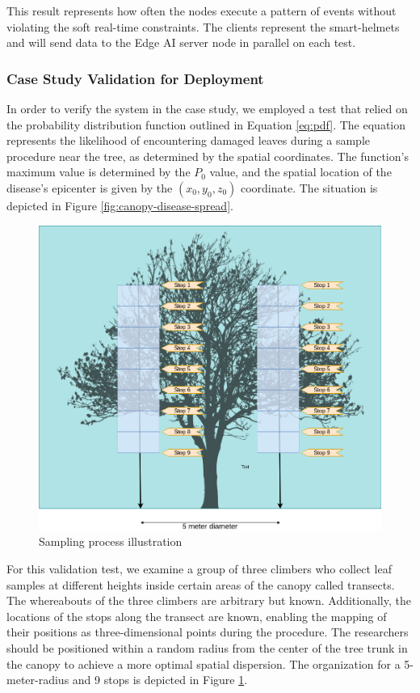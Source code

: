 This result represents how often the nodes execute a pattern of events without violating the soft real-time constraints. The clients represent the smart-helmets and will send data to the Edge AI server node in parallel on each test. 

\subsubsection{Case Study Validation for Deployment}

In order to verify the system in the case study, we employed a test that relied on the probability distribution function outlined in Equation \ref{eq:pdf}. The equation represents the likelihood of encountering damaged leaves during a sample procedure near the tree, as determined by the spatial coordinates. The function's maximum value is determined by the $P_0$ value, and the spatial location of the disease's epicenter is given by the $(x_0, y_0, z_0)$ coordinate. The situation is depicted in Figure \ref{fig:canopy-disease-spread}.

\begin{figure}[h!]
    \centering
    \includegraphics[width = .8\linewidth]{Figures/pin-cylinder-test.png}
    \caption{Sampling process illustration}
    \label{fig:pin-cylinder-test}
\end{figure}

For this validation test, we examine a group of three climbers who collect leaf samples at different heights inside certain areas of the canopy called transects. The whereabouts of the three climbers are arbitrary but known. Additionally, the locations of the stops along the transect are known, enabling the mapping of their positions as three-dimensional points during the procedure. The researchers should be positioned within a random radius from the center of the tree trunk in the canopy to achieve a more optimal spatial dispersion.  The organization for a 5-meter-radius and 9 stops is depicted in Figure \ref{fig:pin-cylinder-test}.

